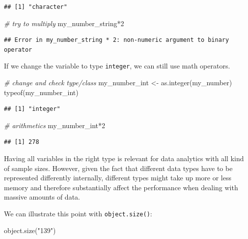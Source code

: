 \documentclass[
  12pt,
]{style/krantz}
\newenvironment{Shaded}{\begin{snugshade}}{\end{snugshade}}
\newcommand{\CommentTok}[1]{\textcolor[rgb]{0.56,0.35,0.01}{\textit{#1}}}
\newcommand{\DecValTok}[1]{\textcolor[rgb]{0.00,0.00,0.81}{#1}}
\newcommand{\FunctionTok}[1]{\textcolor[rgb]{0.00,0.00,0.00}{#1}}
\newcommand{\NormalTok}[1]{#1}
\newcommand{\OtherTok}[1]{\textcolor[rgb]{0.56,0.35,0.01}{#1}}
\newcommand{\SpecialCharTok}[1]{\textcolor[rgb]{0.00,0.00,0.00}{#1}}
\newcommand{\StringTok}[1]{\textcolor[rgb]{0.31,0.60,0.02}{#1}}
\begin{document}
\begin{verbatim}
## [1] "character"
\end{verbatim}

\begin{Shaded}
\begin{Highlighting}[]
\CommentTok{\# try to multiply}
\NormalTok{my\_number\_string}\SpecialCharTok{*}\DecValTok{2}
\end{Highlighting}
\end{Shaded}

\begin{verbatim}
## Error in my_number_string * 2: non-numeric argument to binary operator
\end{verbatim}

If we change the variable to type \texttt{integer}, we can still use math operators.

\begin{Shaded}
\begin{Highlighting}[]
\CommentTok{\# change and check type/class}
\NormalTok{my\_number\_int }\OtherTok{\textless{}{-}} \FunctionTok{as.integer}\NormalTok{(my\_number)}
\FunctionTok{typeof}\NormalTok{(my\_number\_int)}
\end{Highlighting}
\end{Shaded}

\begin{verbatim}
## [1] "integer"
\end{verbatim}

\begin{Shaded}
\begin{Highlighting}[]
\CommentTok{\# arithmetics}
\NormalTok{my\_number\_int}\SpecialCharTok{*}\DecValTok{2}
\end{Highlighting}
\end{Shaded}

\begin{verbatim}
## [1] 278
\end{verbatim}

Having all variables in the right type is relevant for data analytics with all kind of sample sizes. However, given the fact that different data types have to be represented differently internally, different types might take up more or less memory and therefore substantially affect the performance when dealing with massive amounts of data.

We can illustrate this point with \texttt{object.size()}:

\begin{Shaded}
\begin{Highlighting}[]
\FunctionTok{object.size}\NormalTok{(}\StringTok{"139"}\NormalTok{)}
\end{Highlighting}
\end{Shaded}
\end{document}
